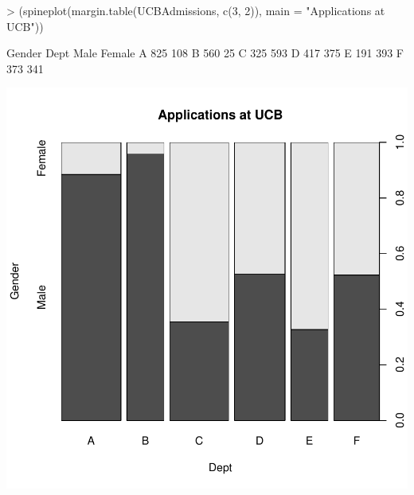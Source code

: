 \documentclass[12pt,letterpaper,final]{article}
\begin{document}
\begin{Schunk}
\begin{Sinput}
> (spineplot(margin.table(UCBAdmissions, c(3, 2)), main = "Applications at UCB"))
\end{Sinput}
\begin{Soutput}
    Gender
Dept Male Female
   A  825    108
   B  560     25
   C  325    593
   D  417    375
   E  191    393
   F  373    341
\end{Soutput}
\end{Schunk}
\includegraphics{lect_main-050}
\end{document}
